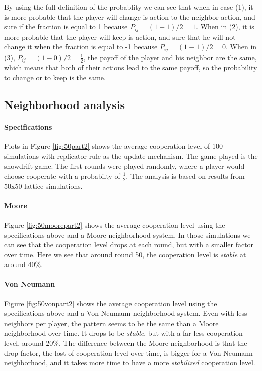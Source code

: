 \documentclass[letterpaper]{article}
\begin{document}
By using the full definition of the probablity we can see that when in
case (1), it is more probable that the player will change is action
to the neighbor action, and sure if the fraction is equal to 1
because $P_{ij} = (1 + 1) / 2 = 1$. When in (2),
it is more probable that the player will keep is action, and sure that
he will not change it when the fraction is equal to -1
because $P_{ij} = (1 - 1) / 2 = 0$. When in (3),
$P_{ij} = (1 - 0) / 2 = \frac{1}{2}$,
the payoff of the player and his neighbor are the same, which means that
both of their actions lead to the same payoff, so the probability to change
or to keep is the same.


\subsection{Neighborhood analysis}

\paragraph{Specifications}
Plots in Figure \ref{fig:50part2} shows the average cooperation level of 100
simulations with replicator rule as the update mechanism. The game played
is the snowdrift game.
The first rounds were played randomly,
where a player would choose cooperate with a probabilty of $\frac{1}{2}$.
The analysis is based on results from 50x50 lattice
simulations.

\paragraph{Moore}

Figure \ref{fig:50moorepart2} shows the average cooperation level using
the specifications above and a Moore neighborhood system.
In those simulations we can see that the cooperation
level drops at each round, but with a smaller factor over time.
Here we see that around round 50, the cooperation level
is \textit{stable} at around 40\%.

\paragraph{Von Neumann}


Figure \ref{fig:50vonpart2} shows the average cooperation level using
the specifications above and a Von Neumann neighborhood system. Even
with less neighbors per player, the pattern seems to be the same
than a Moore neighborhood over time.
It drops to be \textit{stable},
but with a far less cooperation level, around 20\%.
The difference between the Moore neighborhood is that the drop factor,
the lost of cooperation level over time, is bigger for a Von Neumann
neighborhood, and it takes more time to have a more \textit{stabilized}
cooperation level.
\end{document}
